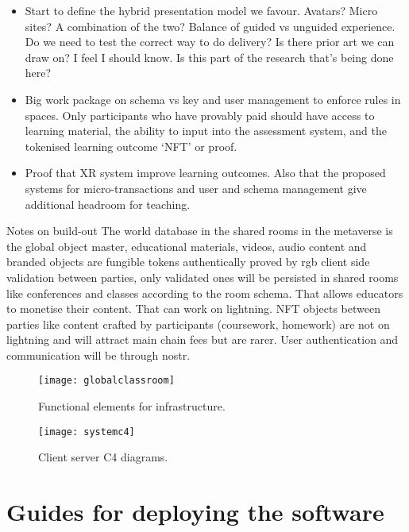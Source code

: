 \documentclass[
	12pt, %
	fleqn, %
	a4paper, %
	oneside, %
]{LegrandOrangeBook}
\begin{document}
\begin{itemize}
\item Start to define the hybrid presentation model we favour. Avatars? Micro sites? A combination of the two? Balance of guided vs unguided experience. Do we need to test the correct way to do delivery? Is there prior art we can draw on? I feel I should know. Is this part of the research that's being done here?
\item Big work package on schema vs key and user management to enforce rules in spaces. Only participants who have provably paid should have access to learning material, the ability to input into the assessment system, and the tokenised learning outcome `NFT' or proof.
\item Proof that XR system improve learning outcomes. Also that the proposed systems for micro-transactions and user and schema management give additional headroom for teaching.
\end{itemize}

Notes on build-out
The world database in the shared rooms in the metaverse is the global object master,  educational materials, videos,  audio content and branded objects are fungible tokens authentically proved by rgb client side validation between parties,  only validated ones will be persisted in shared rooms like conferences and classes according to the room schema. That allows educators to monetise their content.  That can work on lightning.  NFT objects between parties like content crafted by participants (coursework, homework) are not on lightning and will attract main chain fees but are rarer. User authentication and communication will be through nostr.

\begin{figure*}[ht]\centering %
	\texttt{[image: globalclassroom]}
	\caption{Functional elements for infrastructure.}
	\label{fig:globalclassroom}
\end{figure*}

\begin{figure*}[ht]\centering %
	\texttt{[image: systemc4]}
	\caption{Client server C4 diagrams.}
	\label{fig:globalclassroom}
\end{figure*}


\part{Guides for deploying the software}

\end{document}
